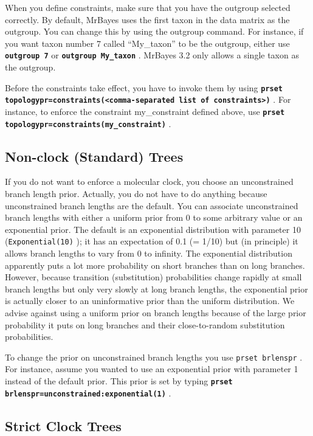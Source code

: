 \documentclass[12pt]{book}
\newcommand{\ttt}[1]{\texttt{#1} }
\newcommand{\tb}[1]{\texttt{\textbf{#1}} }
\begin{document}
When you define constraints, make sure that you have the outgroup selected correctly. By default,
MrBayes uses the first taxon in the data matrix as the outgroup. You can change this by using the
outgroup command. For instance, if you want taxon number 7 called “My\_taxon” to be the outgroup,
either use \tb{outgroup 7} or \tb{outgroup My\_taxon}.  MrBayes 3.2 only allows a single taxon as
the outgroup.

Before the constraints take effect, you have to invoke them by using \tb{prset
topologypr=constraints(<comma-separated list of constraints>)}. For instance, to enforce the
constraint my\_constraint defined above, use \tb{prset topologypr=constraints(my\_constraint)}.

\subsection{Non-clock (Standard) Trees}

If you do not want to enforce a molecular clock, you choose an unconstrained branch length prior.
Actually, you do not have to do anything because unconstrained branch lengths are the default. You
can associate unconstrained branch lengths with either a uniform prior from 0 to some arbitrary
value or an exponential prior. The default is an exponential distribution with parameter 10
(\ttt{Exponential(10)}); it has an expectation of 0.1 (= 1/10) but (in principle) it allows branch
lengths to vary from 0 to infinity. The exponential distribution apparently puts a lot more
probability on short branches than on long branches. However, because transition (substitution)
probabilities change rapidly at small branch lengths but only very slowly at long branch lengths,
the exponential prior is actually closer to an uninformative prior than the uniform distribution.
We advise against using a uniform prior on branch lengths because of the large prior probability it
puts on long branches and their close-to-random substitution probabilities.

To change the prior on unconstrained branch lengths you use \ttt{prset brlenspr}. For instance,
assume you wanted to use an exponential prior with parameter 1 instead of the default prior. This
prior is set by typing \tb{prset brlenspr=unconstrained:exponential(1)}.

\subsection{Strict Clock Trees}
\end{document}
